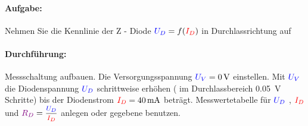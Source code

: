 \documentclass[11pt,a4paper,titlepage,parskip=half]{scrreprt}
\begin{document}
              \paragraph{Aufgabe:} Nehmen Sie die Kennlinie der Z - Diode $\textcolor{blue}{U_D} = f(\textcolor{red}{I_D})$ in Durchlassrichtung auf
              \paragraph{Durchführung:} Messschaltung aufbauen. Die Versorgungsspannung $\textcolor{blue}{U_V} = \SI{0}{\volt}$ einstellen. Mit $\textcolor{blue}{U_V}$ die Diodenspannung $\textcolor{blue}{U_D}$ schrittweise erhöhen ( im Durchlassbereich \SI{0,05}{\volt} Schritte) bis der Diodenstrom $\textcolor{red}{I_D} = \SI{40}{\milli\ampere}$ beträgt. Messwertetabelle für $\textcolor{blue}{U_D}$ , $\textcolor{red}{I_D}$ und $\widerstand{R_D} = \mfrac{\spannung{U_D}}{\strom{I_D}}$ anlegen oder gegebene benutzen.
\end{document}
